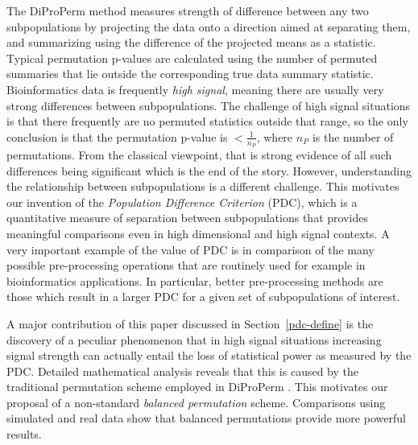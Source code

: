 \documentclass[12pt]{article}
\begin{document}
The DiProPerm method measures strength of difference between any two subpopulations
by projecting the data onto a direction aimed at separating them,
and summarizing using the difference of the projected means as a statistic.
Typical permutation p-values are calculated using the number of permuted
summaries that lie outside the corresponding true data summary statistic.
Bioinformatics data is frequently \emph{high signal}, meaning there are usually
very strong differences between subpopulations.
The challenge of high signal situations is that there frequently are
no permuted statistics outside that range, so the only conclusion
is that the permutation p-value is $<\frac{1}{n_{P}}$, where $n_{P}$
is the number of permutations. From the classical viewpoint, that is strong evidence
of all such differences being significant which is the end of the story.
However, understanding the relationship between subpopulations is
a different challenge.  
This motivates our invention of the \emph{Population Difference Criterion}
(PDC), which is a quantitative measure of separation between subpopulations
that provides meaningful comparisons even in high dimensional and
high signal contexts. 
A very important example of the value of PDC is in comparison
of the many possible pre-processing operations that are routinely
used for example in bioinformatics applications. In particular, better pre-processing
methods are those which result in a larger PDC for a given set of subpopulations
of interest. 


A major contribution of this paper discussed in Section~\ref{pdc-define} is the discovery of a peculiar phenomenon that in high signal situations increasing signal strength can actually entail the loss of statistical power as measured by the PDC. Detailed mathematical analysis reveals that this is caused by the traditional permutation scheme employed in DiProPerm \cite{wei2016direction}. This motivates our proposal of a non-standard {\em balanced permutation} scheme. Comparisons using simulated and real data show that balanced permutations provide more powerful results.
\end{document}
